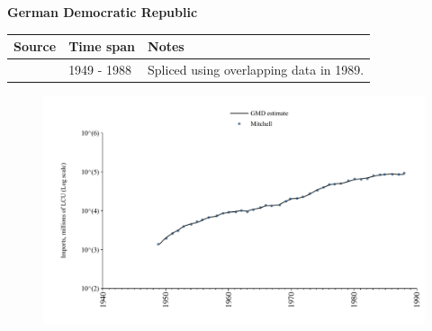 \documentclass[12pt,a4paper,landscape]{article}
\begin{document}
\begin{adjustbox}{max totalsize={\paperwidth}{\paperheight},center}
\begin{minipage}[t][\textheight][t]{\textwidth}
\vspace*{0.5cm}
{}
\begin{center}
{\Large\bfseries German Democratic Republic}
\end{center}
\vspace{0.5cm}
\begin{table}[H]
\centering
\small
\begin{tabular}{|l|l|l|}
\hline
\textbf{Source} & \textbf{Time span} & \textbf{Notes} \\
\hline
\rowcolor{white}\cite{Mitchell}& 1949 - 1988 &Spliced using overlapping data in 1989.\\
\hline
\end{tabular}
\end{table}
\begin{figure}[H]
\centering
\includegraphics[width=\textwidth,height=0.6\textheight,keepaspectratio]{graphs/DDR_imports.pdf}
\end{figure}
\end{minipage}
\end{adjustbox}
\end{document}
